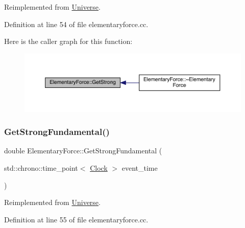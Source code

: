 Reimplemented from \hyperlink{class_universe_acb453ce71da418c5b5617fecede9571b}{Universe}.



Definition at line 54 of file elementaryforce.\+cc.

Here is the caller graph for this function\+:
\nopagebreak
\begin{figure}[H]
\begin{center}
\leavevmode
\includegraphics[width=350pt]{class_elementary_force_aaa1cde27b1508831f67353eb39745a7e_icgraph}
\end{center}
\end{figure}
\mbox{\label{class_elementary_force_a0974d6537c07dac2453d2a607324fa21}} 
\subsubsection{\texorpdfstring{Get\+Strong\+Fundamental()}{GetStrongFundamental()}}
{\footnotesize\ttfamily double Elementary\+Force\+::\+Get\+Strong\+Fundamental (\begin{DoxyParamCaption}\item[{std\+::chrono\+::time\+\_\+point$<$ \hyperlink{universe_8h_a0ef8d951d1ca5ab3cfaf7ab4c7a6fd80}{Clock} $>$}]{event\+\_\+time }\end{DoxyParamCaption})\hspace{0.3cm}{\ttfamily [virtual]}}



Reimplemented from \hyperlink{class_universe_ab44daccba01ee7e3cf9b50bba83dd19e}{Universe}.



Definition at line 55 of file elementaryforce.\+cc.

